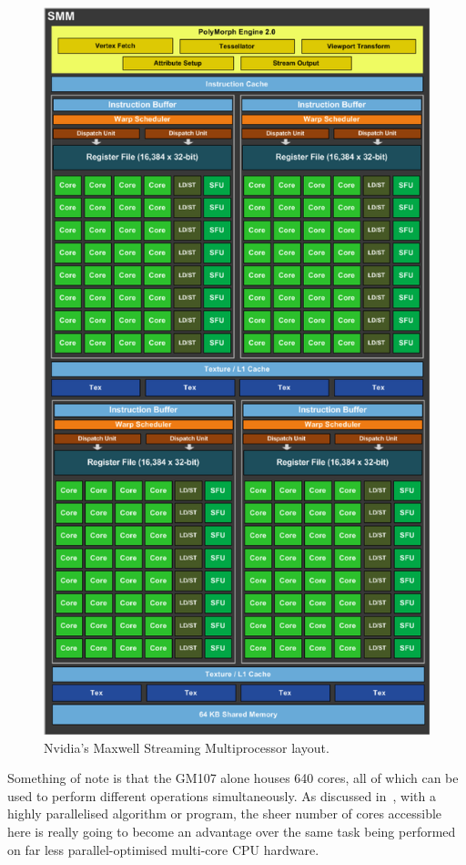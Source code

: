 \documentclass[a4paper,11pt]{article}
\begin{document}
\begin{figure}[ht]
  \centering
  \includegraphics[scale=0.25]{img/maxwell-smm}
  \caption{Nvidia's Maxwell Streaming Multiprocessor layout.~\cite{whitepaper:NvidiaMaxwell}}
\label{fig:maxwell-smm}
\end{figure}

Something of note is that the GM107 alone houses 640 cores, all of which can be used to perform different operations
simultaneously. As discussed in~, with a highly parallelised algorithm or
program, the sheer number of cores accessible here is really going to become an advantage over the same task being performed
on far less parallel-optimised multi-core CPU hardware.
\end{document}
